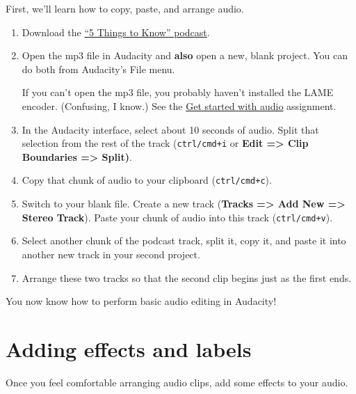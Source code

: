 \documentclass[]{book}
\providecommand{\tightlist}{%
  \setlength{\itemsep}{0pt}\setlength{\parskip}{0pt}}
\theoremstyle{definition}
\theoremstyle{definition}
\theoremstyle{definition}
\theoremstyle{remark}
\begin{document}
First, we'll learn how to copy, paste, and arrange audio.

\begin{enumerate}
\def\labelenumi{\arabic{enumi}.}
\tightlist
\item
  Download the \href{3844-podcast-final.mp3}{``5 Things to Know''
  podcast}.
\item
  Open the mp3 file in Audacity and \textbf{also} open a new, blank
  project. You can do both from Audacity's File menu.

  If you can't open the mp3 file, you probably haven't installed the
  LAME encoder. (Confusing, I know.) See the
  \href{https://canvas.vt.edu/courses/73626/assignments/486486}{Get
  started with audio} assignment.
\item
  In the Audacity interface, select about 10 seconds of audio. Split
  that selection from the rest of the track (\texttt{ctrl/cmd+i} or
  \textbf{Edit =\textgreater{} Clip Boundaries =\textgreater{} Split)}.
\item
  Copy that chunk of audio to your clipboard (\texttt{ctrl/cmd+c}).
\item
  Switch to your blank file. Create a new track (\textbf{Tracks
  =\textgreater{} Add New =\textgreater{} Stereo Track}). Paste your
  chunk of audio into this track (\texttt{ctrl/cmd+v}).
\item
  Select another chunk of the podcast track, split it, copy it, and
  paste it into another new track in your second project.
\item
  Arrange these two tracks so that the second clip begins just as the
  first ends.
\end{enumerate}

You now know how to perform basic audio editing in Audacity!

\hypertarget{adding-effects-and-labels}{%
\section{Adding effects and labels}\label{adding-effects-and-labels}}

Once you feel comfortable arranging audio clips, add some effects to
your audio.
\end{document}

